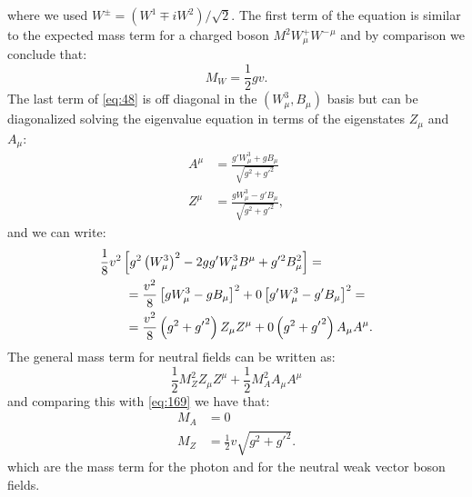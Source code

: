 where we used $W^{\pm} = ( W^{1} \mp i W^{2} ) / \sqrt{2}$. The first term of
the equation is similar to the expected mass term for a charged boson $M^2
W^+_\mu {W^-}^\mu$ and by comparison we conclude that:
\begin{equation}
  \label{eq:49}
  M_{W} = \frac{1}{2} g v.
\end{equation}
The last term of \cref{eq:48} is off diagonal in the $(W_\mu^3, B_\mu)$ basis
but can be diagonalized solving the eigenvalue equation in terms of the
eigenstates $Z_\mu$ and $A_\mu$:
\begin{equation}
  \label{eq:168}
  \begin{aligned}
    A^{\mu} & = \frac{g' W_{\mu}^{3} + g B_{\mu}}{\sqrt{g^{2} +
        {g'}^{2}}} \\
    Z^{\mu} & = \frac{g W_{\mu}^{3} - g' B_{\mu}}{\sqrt{g^{2} +
        {g'}^{2}}},
  \end{aligned}
\end{equation}
and we can write:
\begin{equation}
  \label{eq:169}
  \begin{aligned}
    \MoveEqLeft \frac{1}{8} v^{2} \left[ g^{2} \left(W_{\mu}^{3} \right)^{2} - 2
      g g' W_{\mu}^{3} B^{\mu} + g'^{2} B_{\mu}^{2} \right] = \\
    & = \frac{v^2}{8} \left[g W^{3}_{\mu} - g B_{\mu} \right]^2 + 0 \left[g'
      W^{3}_{\mu} - g' B_{\mu} \right]^{2} = \\
    & = \frac{v^2}{8} \left(g^2 + {g'}^2\right) Z_\mu Z^\mu + 0 \left(g^2 +
      {g'}^2 \right) A_\mu A^\mu.
  \end{aligned}
\end{equation}
The general mass term for neutral fields can be written as:
\begin{equation}
  \label{eq:170}
  \frac{1}{2} M_Z^2 Z_\mu Z^\mu + \frac{1}{2} M_A^2 A_\mu A^\mu
\end{equation}
and comparing this with \cref{eq:169} we have that:
\begin{equation}
  \label{eq:171}
  \begin{aligned}
    M_A & = 0 \\
    M_Z & = \frac{1}{2} v \sqrt{g^2 + {g'}^2}.
  \end{aligned}
\end{equation}
which are the mass term for the photon and for the neutral weak vector boson
fields.

